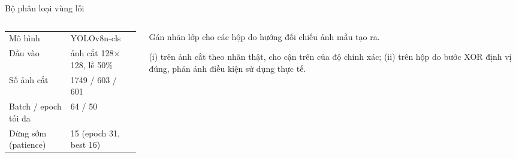 \documentclass[aspectratio=169,11pt,t]{beamer}
\begin{document}
\begin{frame}{Bộ phân loại vùng lỗi}
  \begin{columns}[T]
    \begin{column}{0.48\textwidth}
      \footnotesize
      \renewcommand{\arraystretch}{1.25}\setlength{\tabcolsep}{4pt}
      \begin{tabular}{@{}L{3.0cm}L{3.2cm}@{}}
        \toprule
        Mô hình & YOLOv8n-cls \\
        Đầu vào & ảnh cắt 128$\times$128, lề 50\% \\
        Số ảnh cắt & 1749 / 603 / 601 \\
        Batch / epoch tối đa & 64 / 50 \\
        Dừng sớm (patience) & 15 (epoch 31, best 16) \\
        \bottomrule
      \end{tabular}
    \end{column}
    \begin{column}{0.48\textwidth}
      \begin{why}
        \footnotesize Gán nhãn lớp cho các hộp do hướng đối chiếu ảnh mẫu tạo ra.
      \end{why}
      \vspace{4pt}
      \begin{key}
        \footnotesize (i) trên ảnh cắt theo nhãn thật, cho cận trên của độ chính xác; (ii) trên hộp do bước XOR định vị đúng, phản ánh điều kiện sử dụng thực tế.
      \end{key}
    \end{column}
  \end{columns}
\end{frame}
\end{document}
